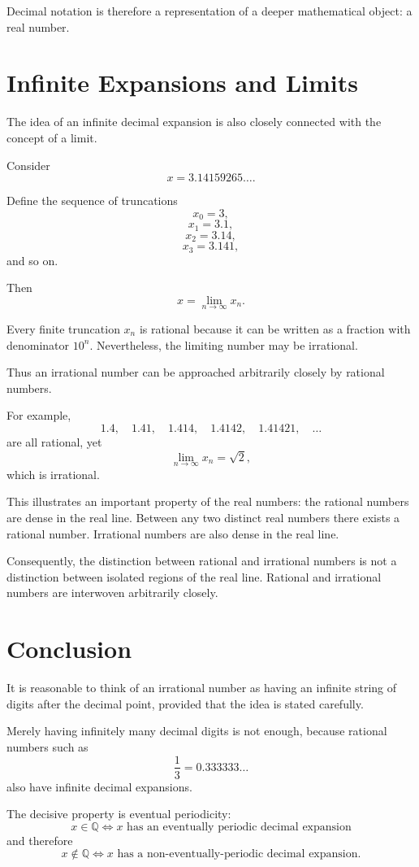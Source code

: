 \documentclass{essay}
\begin{document}
Decimal notation is therefore a representation of a deeper mathematical object: a real number.

\section{Infinite Expansions and Limits}

The idea of an infinite decimal expansion is also closely connected with the concept of a limit.

Consider
\[
x=3.14159265\ldots.
\]

Define the sequence of truncations
\[
x_0=3,
\]
\[
x_1=3.1,
\]
\[
x_2=3.14,
\]
\[
x_3=3.141,
\]
and so on.

Then
\[
x=\lim_{n\to\infty}x_n.
\]

Every finite truncation \(x_n\) is rational because it can be written as a fraction with denominator \(10^n\). Nevertheless, the limiting number may be irrational.

Thus an irrational number can be approached arbitrarily closely by rational numbers.

For example,
\[
1.4,\quad
1.41,\quad
1.414,\quad
1.4142,\quad
1.41421,\quad\ldots
\]
are all rational, yet
\[
\lim_{n\to\infty}x_n=\sqrt{2},
\]
which is irrational.

This illustrates an important property of the real numbers: the rational numbers are dense in the real line. Between any two distinct real numbers there exists a rational number. Irrational numbers are also dense in the real line.

Consequently, the distinction between rational and irrational numbers is not a distinction between isolated regions of the real line. Rational and irrational numbers are interwoven arbitrarily closely.

\section{Conclusion}

It is reasonable to think of an irrational number as having an infinite string of digits after the decimal point, provided that the idea is stated carefully.

Merely having infinitely many decimal digits is not enough, because rational numbers such as
\[
\frac13=0.333333\ldots
\]
also have infinite decimal expansions.

The decisive property is eventual periodicity:
\[
\boxed{
x\in\mathbb{Q}
\iff
\text{\(x\) has an eventually periodic decimal expansion}
}
\]
and therefore
\[
\boxed{
x\notin\mathbb{Q}
\iff
\text{\(x\) has a non-eventually-periodic decimal expansion}.
}
\]
\end{document}
